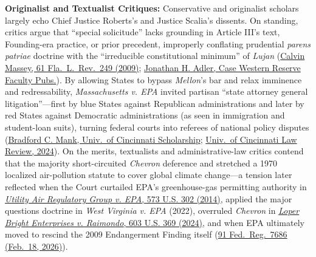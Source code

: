 \documentclass[12pt]{article}
\begin{document}
\textbf{Originalist and Textualist Critiques:} Conservative and originalist scholars largely echo Chief Justice Roberts's and Justice Scalia's dissents. On standing, critics argue that ``special solicitude'' lacks grounding in Article III's text, Founding-era practice, or prior precedent, improperly conflating prudential \textit{parens patriae} doctrine with the ``irreducible constitutional minimum'' of \textit{Lujan} (\href{https://scholarship.law.ufl.edu/cgi/viewcontent.cgi?article=1677&context=flr}{Calvin Massey, 61 Fla.\ L.\ Rev.\ 249 (2009)}; \href{https://scholarlycommons.law.case.edu/cgi/viewcontent.cgi?article=1185&context=faculty_publications}{Jonathan H. Adler, Case Western Reserve Faculty Pubs.}). By allowing States to bypass \textit{Mellon}'s bar and relax imminence and redressability, \textit{Massachusetts v. EPA} invited partisan ``state attorney general litigation''---first by blue States against Republican administrations and later by red States against Democratic administrations (as seen in immigration and student-loan suits), turning federal courts into referees of national policy disputes (\href{https://scholarship.law.uc.edu/cgi/viewcontent.cgi?article=1368&context=fac_pubs}{Bradford C. Mank, Univ.\ of Cincinnati Scholarship}; \href{https://scholarship.law.uc.edu/cgi/viewcontent.cgi?article=1550&context=uclr}{Univ.\ of Cincinnati Law Review, 2024}). On the merits, textualists and administrative-law critics contend that the majority short-circuited \textit{Chevron} deference and stretched a 1970 localized air-pollution statute to cover global climate change---a tension later reflected when the Court curtailed EPA's greenhouse-gas permitting authority in \href{https://supreme.justia.com/cases/federal/us/573/302/}{\textit{Utility Air Regulatory Group v. EPA}, 573 U.S. 302 (2014)}, applied the major questions doctrine in \textit{West Virginia v. EPA} (2022), overruled \textit{Chevron} in \href{https://supreme.justia.com/cases/federal/us/603/22-451/}{\textit{Loper Bright Enterprises v. Raimondo}, 603 U.S. 369 (2024)}, and when EPA ultimately moved to rescind the 2009 Endangerment Finding itself (\href{https://www.federalregister.gov/documents/2026/02/18/2026-03157/rescission-of-the-greenhouse-gas-endangerment-finding-and-motor-vehicle-greenhouse-gas-emission}{91 Fed.\ Reg.\ 7686 (Feb.\ 18, 2026)}).
\end{document}
